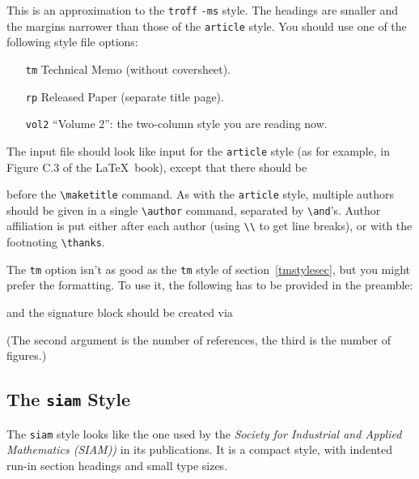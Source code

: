 This is an approximation to the {\tt troff\/} \verb|-ms| style.
The headings are smaller and the margins narrower than those of the
\verb|article| style.
You should use one of the following style file options:
\begin{itemize}
\item[{\tt tm}\hfill] Technical Memo (without coversheet).
\item[{\tt rp}\hfill] Released Paper (separate title page).
\item[{\tt vol2}\hfill] ``Volume 2'': the two-column style you are reading now.
\end{itemize}

The input file should look like input for the \verb|article|
style (as for example, in Figure C.3 of the \LaTeX\ book),
except that there should be
\begin{eg}
\end{eg}
before the \verb|\maketitle| command.
As with the \verb|article| style, multiple authors
should be given in a single \verb|\author| command,
separated by \verb|\and|'s.  Author affiliation is put
either after each author (using \verb|\\| to get line breaks),
or with the footnoting \verb|\thanks|.

The {\tt tm} option isn't as good as the {\tt tm} style of
section~\ref{tmstylesec}, but you might prefer the formatting.
To use it, the following has to be provided in the preamble:
\begin{eg}
\end{eg}
and the signature block should be created via
\begin{eg}
\end{eg}
(The second argument is the number of references, the third is
the number of figures.)

\subsection{The {\tt siam} Style}

The {\tt siam} style looks like the one used by the
{\em Society for Industrial and Applied Mathematics (SIAM)\/)}
in its publications.
It is a compact style, with indented run-in section headings
and small type sizes.

